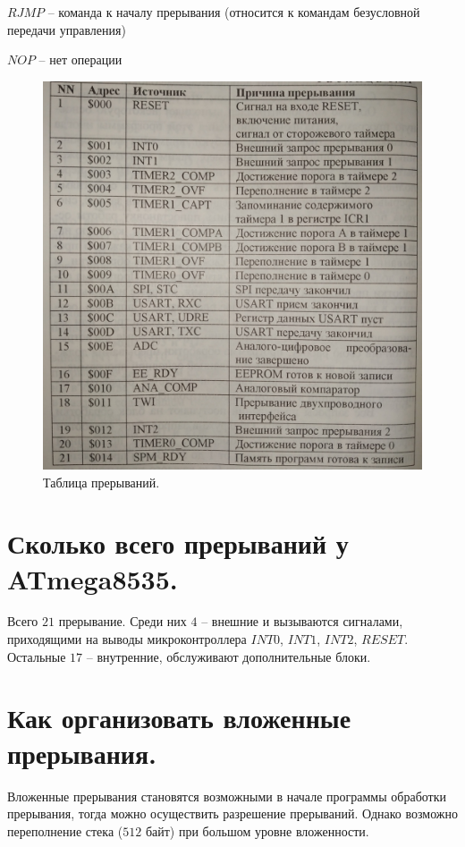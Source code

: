 $RJMP$ -- команда к началу прерывания (относится к командам безусловной передачи управления)

$NOP$ -- нет операции


\begin{figure}[h!]
  \includegraphics[width=\linewidth]{pics/27.jpg}
  \caption{Таблица прерываний.}
  \label{img::table}
\end{figure}


\section{Сколько всего прерываний у ATmega8535.}
Всего $21$ прерывание. Среди них $4$ -- внешние 
и вызываются сигналами, приходящими на выводы микроконтроллера
$INT0$, $INT1$, $INT2$, $RESET$. Остальные $17$ -- внутренние, обслуживают
дополнительные блоки.


\section{Как организовать вложенные прерывания.}
Вложенные прерывания становятся возможными в начале программы обработки
прерывания, тогда можно осуществить разрешение прерываний. Однако 
возможно переполнение стека ($512$ байт) при большом уровне вложенности.


